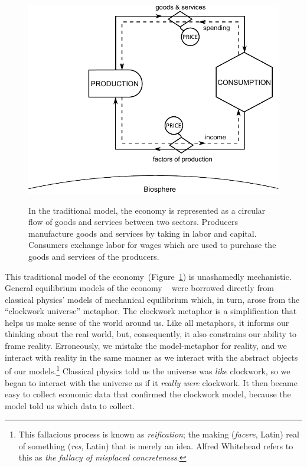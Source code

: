 \begin{figure}[!ht]
\centering\
\includegraphics[width=\linewidth]{Part_0/Chapter_Introduction/images/Perpetual_motion_1.pdf}
\caption[The traditional model]{In the traditional model, the economy 
is represented as a circular flow of goods and services between two sectors. 
Producers manufacture goods and services 
by taking in labor and capital. 
Consumers exchange labor for wages 
which are used to purchase 
the goods and services of the producers.}
\label{fig:perp_motion_1}
\end{figure}

This traditional model of the economy~(Figure~\ref{fig:perp_motion_1}) 
is unashamedly mechanistic.
General equilibrium models of the economy
~\cite{Walras1892, Walras1993}
were borrowed directly from classical physics' models of 
mechanical equilibrium which, in turn, arose from the 
``clockwork universe'' metaphor.\cite{Ingrao1990}
The clockwork metaphor is a simplification 
that helps us make sense of the world around us.
Like all metaphors, it informs our thinking about the real world,
but, consequently,
it also constrains our ability to frame reality.
Erroneously, we mistake the model-metaphor for reality, and
we interact with reality in the same manner 
as we interact with the abstract objects of our
models.\footnote{This fallacious process is known as
	\emph{reification}; the making (\emph{facere}, Latin) real of
	something (\emph{res}, Latin) that is merely an idea.
	Alfred Whitehead refers to this as
	\emph{the fallacy of misplaced concreteness}.\cite{Whitehead2011}
	}
Classical physics told us the universe was
\emph{like} clockwork, 
so we began to interact with the universe
as if it \emph{really were} clockwork.
It then became easy to collect economic data that confirmed the clockwork model,
because the model told us which data to collect.

